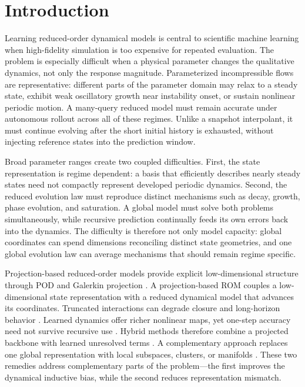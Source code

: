 \section{Introduction}

Learning reduced-order dynamical models is central to scientific machine learning when
high-fidelity simulation is too expensive for repeated evaluation. The problem is
especially difficult when a physical parameter changes the qualitative dynamics, not
only the response magnitude. Parameterized incompressible flows are representative:
different parts of the parameter domain may relax to a steady state, exhibit weak
oscillatory growth near instability onset, or sustain nonlinear periodic motion. A
many-query reduced model must remain accurate under autonomous rollout across all of
these regimes. Unlike a snapshot interpolant, it must continue evolving after the short
initial history is exhausted, without injecting reference states into the prediction
window.

Broad parameter ranges create two coupled difficulties. First, the state representation
is regime dependent: a basis that efficiently describes nearly steady states need not
compactly represent developed periodic dynamics. Second, the reduced evolution law must
reproduce distinct mechanisms such as decay, growth, phase evolution, and saturation.
A global model must solve both problems simultaneously, while recursive prediction
continually feeds its own errors back into the dynamics. The difficulty is therefore not
only model capacity: global coordinates can spend dimensions reconciling distinct state
geometries, and one global evolution law can average mechanisms that should remain
regime specific.

Projection-based reduced-order models provide explicit low-dimensional structure through
POD and Galerkin projection \citep{sirovich1987,berkooz1993,benner2015}. A projection-based
ROM couples a low-dimensional state representation with a reduced dynamical model
that advances its coordinates. Truncated interactions can degrade closure and
long-horizon behavior \citep{amsallem2012}.
Learned dynamics offer richer nonlinear maps, yet one-step accuracy need not survive
recursive use \citep{pathak2018,vlachas2018,duraisamy2019,brunton2020}. Hybrid methods
therefore combine a projected backbone with learned unresolved terms
\citep{dar2023,lee2020,fresca2022,geelen2023}. A complementary approach replaces one
global representation with local subspaces, clusters, or manifolds
\citep{kaiser2014,li2021cluster,diaz2024}. These two remedies address complementary
parts of the problem---the first improves the dynamical inductive bias, while the second
reduces representation mismatch.

